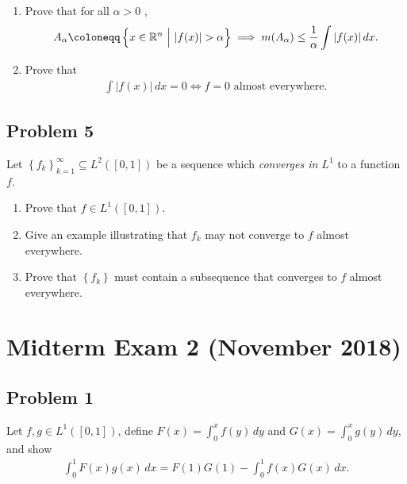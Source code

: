 \begin{enumerate}
\def\labelenumi{\alph{enumi}.}
\item
  Prove that for all \(\alpha> 0\) ,
  \begin{align*}
  A_ \alpha  \coloneqq\left\{{x\in {\mathbb{R}}^n {~\mathrel{\Big|}~}{\left\lvert { f(x) } \right\rvert} > \alpha}\right\} \implies m(A_ \alpha) \leq {1\over \alpha} \int {\left\lvert {f (x)} \right\rvert} \,dx
  .\end{align*}
\item
  Prove that
  \begin{align*}
  \int {\left\lvert { f(x) } \right\rvert} \,dx= 0 \iff f = 0 \text{ almost everywhere}
  .\end{align*}
\end{enumerate}

\hypertarget{problem-5}{%
\subsection{Problem 5}\label{problem-5}}

Let \(\left\{{ f_k }\right\}_{k=1}^{\infty } \subseteq L^2([0, 1])\) be
a sequence which \emph{converges in \(L^1\)} to a function \(f\).

\begin{enumerate}
\def\labelenumi{\alph{enumi}.}
\item
  Prove that \(f\in L^1([0, 1])\).
\item
  Give an example illustrating that \(f_k\) may not converge to \(f\)
  almost everywhere.
\item
  Prove that \(\left\{{f_k}\right\}\) must contain a subsequence that
  converges to \(f\) almost everywhere.
\end{enumerate}

\hypertarget{midterm-exam-2-november-2018}{%
\section{Midterm Exam 2 (November
2018)}\label{midterm-exam-2-november-2018}}

\hypertarget{problem-1-1}{%
\subsection{Problem 1}\label{problem-1-1}}

Let \(f, g\in L^1([0, 1])\), define \(F(x) = \int_0^x f(y)\,dy\) and
\(G(x) = \int_0^x g(y)\,dy\), and show
\begin{align*}
\int_0^1 F(x)g(x) \,dx = F(1)G(1) - \int_0^1 f(x) G(x) \, dx
.\end{align*}

